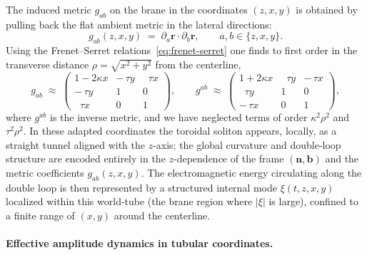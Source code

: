The induced metric $g_{ab}$ on the brane in the coordinates
$(z,x,y)$ is obtained by pulling back the flat ambient metric
in the lateral directions:
%
\begin{equation}
  g_{ab}(z,x,y)
  \;=\;
  \partial_a\mathbf r\cdot\partial_b\mathbf r,
  \qquad a,b\in\{z,x,y\}.
  \label{eq:tubular-metric-def}
\end{equation}
%
Using the Frenet--Serret relations~\eqref{eq:frenet-serret} one finds
to first order in the transverse distance $\rho=\sqrt{x^2+y^2}$ from
the centerline,
%
\begin{equation}
  g_{ab}
  \;\approx\;
  \begin{pmatrix}
    1 - 2\kappa x & -\,\tau y & \;\;\tau x \\[0.4ex]
    -\,\tau y & 1 & 0 \\[0.4ex]
    \;\;\tau x & 0 & 1
  \end{pmatrix},
  \qquad
  g^{ab}
  \;\approx\;
  \begin{pmatrix}
    1 + 2\kappa x & \;\;\tau y & -\,\tau x \\[0.4ex]
    \;\;\tau y & 1 & 0 \\[0.4ex]
    -\,\tau x & 0 & 1
  \end{pmatrix},
  \label{eq:tubular-metric}
\end{equation}
%
where $g^{ab}$ is the inverse metric, and we have neglected terms of
order $\kappa^2\rho^2$ and $\tau^2\rho^2$. In these adapted
coordinates the toroidal soliton appears, locally, as a straight tunnel
aligned with the $z$-axis; the global curvature and double-loop
structure are encoded entirely in the $z$-dependence of the frame
$(\mathbf n,\mathbf b)$ and the metric coefficients $g_{ab}(z,x,y)$.
The electromagnetic energy circulating along the double loop is then
represented by a structured internal mode $\xi(t,z,x,y)$ localized
within this world-tube (the brane region where $|\xi|$ is large),
confined to a finite range of $(x,y)$ around the centerline.

\paragraph{Effective amplitude dynamics in tubular coordinates.}

